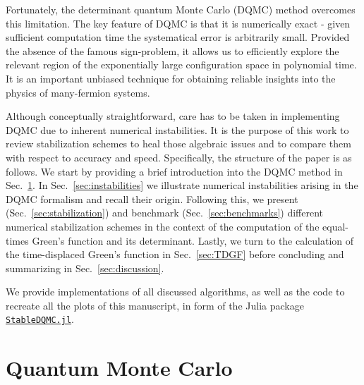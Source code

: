 \documentclass[%
 reprint,
superscriptaddress,
citeautoscript,
showpacs,
 amsmath,amssymb,
 aps,
 prb,
longbibliography,
]{revtex4-2}
\begin{document}
Fortunately, the determinant quantum Monte Carlo (DQMC) method overcomes this limitation. The key feature of DQMC is that it is numerically exact - given sufficient computation time the systematical error is arbitrarily small. Provided the absence of the famous sign-problem, it allows us to efficiently explore the relevant region of the exponentially large configuration space in polynomial time. It is an important unbiased technique for obtaining reliable insights into the physics of many-fermion systems.

Although conceptually straightforward, care has to be taken in implementing DQMC due to inherent numerical instabilities. It is the purpose of this work to review stabilization schemes to heal those algebraic issues and to compare them with respect to accuracy and speed.
 Specifically, the structure of the paper is as follows. We start by providing a brief introduction into the DQMC method in Sec.~\ref{sec:QMC}. In Sec.~\ref{sec:instabilities} we illustrate numerical instabilities arising in the DQMC formalism and recall their origin. Following this, we present (Sec.~\ref{sec:stabilization}) and benchmark (Sec.~\ref{sec:benchmarks}) different numerical stabilization schemes in the context of the computation of the equal-times Green's function and its determinant. Lastly, we turn to the calculation of the time-displaced Green's function in Sec.~\ref{sec:TDGF} before concluding and summarizing in Sec.~\ref{sec:discussion}.
 
We provide implementations of all discussed algorithms, as well as the code to recreate all the plots of this manuscript, in form of the Julia package \href{http://github.com/crstnbr/StableDQMC.jl}{\texttt{StableDQMC.jl}}.

\section{Quantum Monte Carlo}\label{sec:QMC}
\end{document}
